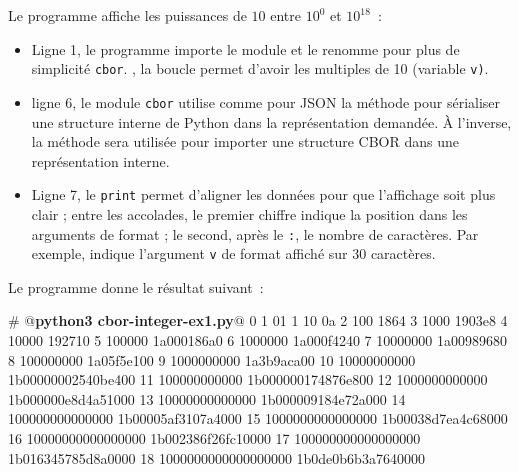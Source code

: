       \vspace{1em}


Le programme   affiche les puissances de $10$ entre $10^0$ et $10^{18}$~:

\begin{itemize}
    \item Ligne 1, le programme importe le module \texttt{} et le renomme pour plus de simplicité \texttt{cbor}.
    , la boucle permet d'avoir les multiples de 10 (variable \texttt{v)}. 
    \item ligne 6, le module \texttt{cbor} utilise comme pour JSON la méthode  pour sérialiser une structure interne de Python dans la représentation demandée. À l'inverse, la méthode  sera utilisée pour importer une structure CBOR dans une représentation interne.
    \item Ligne 7, le \texttt{print} permet d'aligner les données pour que l'affichage soit plus clair ; entre les accolades, le premier chiffre indique la position dans les arguments de format ; le second, après le \texttt{:}, le nombre de caractères. Par exemple,  indique l'argument \texttt{v} de format affiché sur 30 caractères.
\end{itemize}
 
       \vspace{1em}

Le programme donne le résultat suivant~:

\begin{termc}[backgroundcolor=\color{palerod}, language=json, basicstyle=\ttfamily\small, escapechar=@]
 # @\textbf{python3 cbor-integer-ex1.py}@
  0                              1 01
  1                             10 0a
  2                            100 1864
  3                           1000 1903e8
  4                          10000 192710
  5                         100000 1a000186a0
  6                        1000000 1a000f4240
  7                       10000000 1a00989680
  8                      100000000 1a05f5e100
  9                     1000000000 1a3b9aca00
 10                    10000000000 1b00000002540be400
 11                   100000000000 1b000000174876e800
 12                  1000000000000 1b000000e8d4a51000
 13                 10000000000000 1b000009184e72a000
 14                100000000000000 1b00005af3107a4000
 15               1000000000000000 1b00038d7ea4c68000
 16              10000000000000000 1b002386f26fc10000
 17             100000000000000000 1b016345785d8a0000
 18            1000000000000000000 1b0de0b6b3a7640000
\end{termc}

